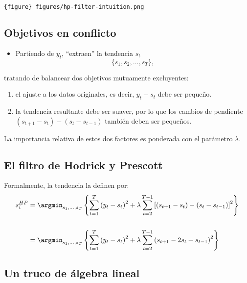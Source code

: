 \documentclass[11pt]{article}
\providecommand{\tightlist}{%
      \setlength{\itemsep}{0pt}\setlength{\parskip}{0pt}}
\begin{document}
\texttt{\{figure\}\ figures/hp-filter-intuition.png}

\hypertarget{objetivos-en-conflicto}{%
\subsection{Objetivos en conflicto}\label{objetivos-en-conflicto}}

\begin{itemize}
\tightlist
\item
  Partiendo de \(y_t\), \cite{Hodrick-Prescott:1997} ``extraen'' la
  tendencia \(s_t\) \begin{equation*}
  \{s_1, s_2, \dots, s_T\},
  \end{equation*}
\end{itemize}

tratando de balancear dos objetivos mutuamente excluyentes:

\begin{enumerate}
\def\labelenumi{\arabic{enumi}.}
\tightlist
\item
  el ajuste a los datos originales, es decir, \(y_t-s_t\) debe ser
  pequeño.
\item
  la tendencia resultante debe ser suaver, por lo que los cambios de
  pendiente \((s_{t+1}-s_t)-(s_t-s_{t-1})\) también deben ser pequeños.
\end{enumerate}

La importancia relativa de estos dos factores es ponderada con el
parámetro \(\lambda\).

\hypertarget{el-filtro-de-hodrick-y-prescott-1}{%
\subsection{El filtro de Hodrick y
Prescott}\label{el-filtro-de-hodrick-y-prescott-1}}

Formalmente, la tendencia la definen por: \begin{align*}
s_i^{HP} &=   \argmin_{s_1,\dots,s_T}\left\{\sum_{t=1}^{T}\left(y_t-s_t\right)^2 +  \lambda \sum_{t=2}^{T-1}\left[\left(s_{t+1}-s_t\right) - \left(s_t-s_{t-1}\right)  \right]^2    \right\}\\ \\
         &= \argmin_{s_1,\dots,s_T}\left\{\sum_{t=1}^{T}\left(y_t-s_t\right)^2 +  \lambda \sum_{t=2}^{T-1}\left(s_{t+1}-2s_t + s_{t-1}\right)^2 \right\}
\end{align*}

\hypertarget{un-truco-de-uxe1lgebra-lineal}{%
\subsection{Un truco de álgebra
lineal}\label{un-truco-de-uxe1lgebra-lineal}}
\end{document}
